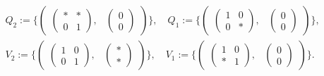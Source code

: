 \documentclass[a4paper,11pt,reqno]{amsart}
\numberwithin{equation}{section}
\theoremstyle{remark}
\theoremstyle{definition}
\begin{document}
\begin{align*}
&Q_2:=\bigg\{\begin{pmatrix} \begin{pmatrix}*&*\\0&1\end{pmatrix},&\!\!\!\!\begin{pmatrix}0\\0\end{pmatrix}\end{pmatrix}\bigg\},
\quad Q_1:=\bigg\{\begin{pmatrix} \begin{pmatrix}1&0\\0&*\end{pmatrix},&\!\!\!\!\begin{pmatrix}0\\0\end{pmatrix}\end{pmatrix}\bigg\},
\\
&V_2:=\bigg\{\begin{pmatrix} \begin{pmatrix}1&0\\0&1\end{pmatrix},&\!\!\!\!\begin{pmatrix}*\\ *\end{pmatrix}\end{pmatrix}\bigg\},
\quad V_1:=\bigg\{\begin{pmatrix} \begin{pmatrix}1&0\\ *&1\end{pmatrix},&\!\!\!\!\begin{pmatrix}0\\0\end{pmatrix}\end{pmatrix}\bigg\}.
\end{align*}
\end{document}
